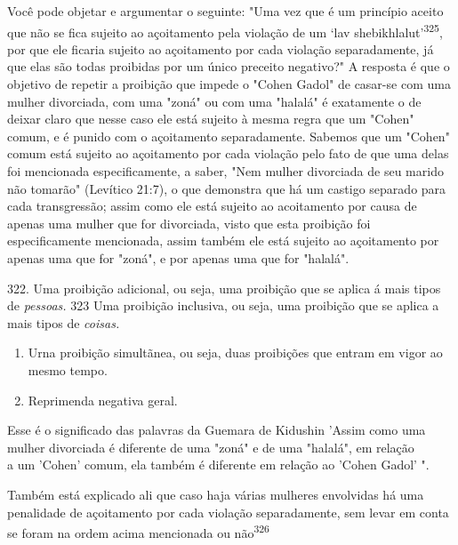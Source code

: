 \begin{itemize}
\begin{enumrate}
\begin{itemize}
\begin{itemize}
\begin{itemize}
Você pode objetar e argumentar o seguinte: "Uma vez que é um prin­cípio
aceito que não se fica sujeito ao açoitamento pela violação de um `lav
she­bikhlalut'\textsuperscript{325}, por que ele ficaria sujeito ao
açoitamento por cada violação sepa­radamente, já que elas são todas
proibidas por um único preceito negativo?" A resposta é que o objetivo
de repetir a proibição que impede o "Cohen Gadol" de casar-se com uma
mulher divorciada, com uma "zoná" ou com uma "halalá" é exatamente o de
deixar claro que nesse caso ele está sujeito à mesma regra que um
"Cohen" comum, e é punido com o açoitamento separadamente. Sabe­mos que
um "Cohen" comum está sujeito ao açoitamento por cada violação pe­lo
fato de que uma delas foi mencionada especificamente, a saber, "Nem
mulher divorciada de seu marido não tomarão" (Levítico 21:7), o que
demonstra que há um castigo separado para cada transgressão; assim como
ele está sujeito ao acoitamento por causa de apenas uma mulher que for
divorciada, visto que esta proibição foi especificamente mencionada,
assim também ele está sujeito ao açoi­tamento por apenas uma que for
"zoná", e por apenas uma que for "halalá".

322. Uma proibição adicional, ou seja, uma proibição que se aplica á
mais tipos de \emph{pessoas.} 323 Uma proibição inclusiva, ou seja, uma
proibição que se aplica a mais tipos de \emph{coisas.}


\begin{enumerate}
\def\labelenumi{\arabic{enumi}.}
\setcounter{enumi}{323}
\item
 
 Urna proibição simultãnea, ou seja, duas proibições que entram em
 vigor ao mesmo tempo.
 
\item
 
 Reprimenda negativa geral.
 
\end{enumerate}



Esse é o significado das palavras da Guemara de Kidushin 'Assim como
uma\\
mulher divorciada é diferente de uma "zoná" e de uma "halalá", em
relação\\
a um 'Cohen' comum, ela também é diferente em relação ao 'Cohen Gadol'
".

Também está explicado ali que caso haja várias mulheres envolvidas há
uma penalidade de açoitamento por cada violação separadamente, sem
le­var em conta se foram na ordem acima mencionada ou
não\textsuperscript{326}


\end{itemize}
\end{itemize}
\end{itemize}
\end{enumrate}
\end{itemize}

